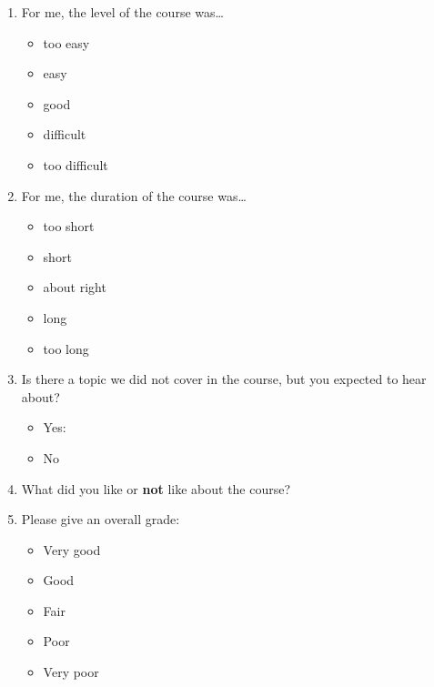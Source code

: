 \documentclass{scrartcl}
\begin{document}
\begin{enumerate}
\begin{multicols}{3}
\begin{itemize}[label={\Square}]
      \item established in your group
      \item ignored by your group
      \item unknown to you / your group
    \end{itemize}
  \end{multicols}
\item For me, the level of the course was\ldots
  \begin{multicols}{5}
    \begin{itemize}[label={\Square}]
    \item too easy
    \item easy
    \item good
    \item difficult
    \item too difficult
    \end{itemize}
  \end{multicols}
\pagebreak
\item For me, the duration of the course was\ldots
  \begin{multicols}{5}
    \begin{itemize}[label={\Square}]
    \item too short
    \item short
    \item about right
    \item long
    \item too long
    \end{itemize}
  \end{multicols}
\item Is there a topic we did not cover in the course, but you expected to hear about?
    \begin{itemize}[label={\Square}]
    \item Yes: 
    \item No
    \end{itemize}
  \item What did you like or \textbf{not} like about the course?
    \vspace{1.7cm}
  \item Please give an overall grade:
    \begin{multicols}{5}
    \begin{itemize}[label={\Square}]
    \item Very good
    \item Good
    \item Fair
    \item Poor
    \item Very poor
    \end{itemize}
  \end{multicols}
\end{enumerate}
\end{document}
